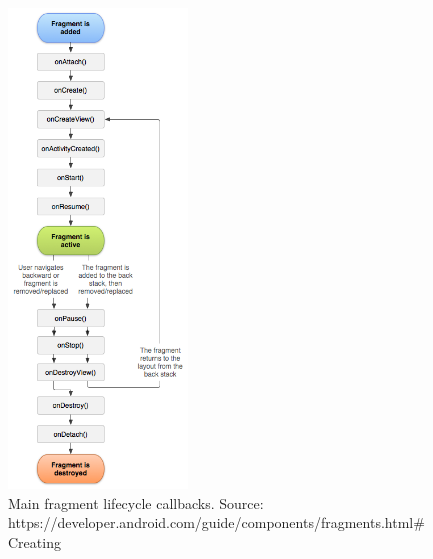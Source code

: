 \documentclass[11pt,a4paper,notitlepage]{article}
\begin{document}
\begin{figure}
  \centering
  \includegraphics[width=180px]{Images/Android/fragment_lifecycle.png}
  \caption[Fragment lifecycle]{Main fragment lifecycle callbacks. Source: https://developer.android.com/guide/components/fragments.html\#Creating}
  \label{fig:fra_lifec}
\end{figure}
\end{document}
